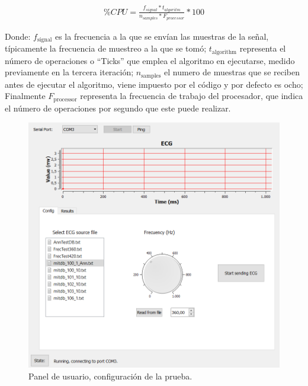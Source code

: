         \begin{align*}
            \%CPU = \frac{f_{signal}*t_{algoritm}}{n_{samples} * F_{processor}} * 100
        \end{align*}
        
         Donde: \( f_{\mathrm{signal}}\) es la frecuencia a la que se envían las muestras de la señal, típicamente la frecuencia de muestreo a la que se tomó; \( t_{\mathrm{algorithm}}\) representa el número de operaciones o ``Ticks'' que emplea el algoritmo en ejecutarse, medido previamente en la tercera iteración; \( n_{\mathrm{samples}}\) el numero de muestras que se reciben antes de ejecutar el algoritmo, viene impuesto por el código y por defecto es ocho; Finalmente  \( F_{\mathrm{processor}}\) representa la frecuencia de trabajo del procesador, que indica el número de operaciones por segundo que este puede realizar.
         
          \begin{figure}[H]
            \centering
                    \includegraphics[width = \linewidth]{figuras/Config.PNG}
            \caption{Panel de usuario, configuración de la prueba.}
            \label{fig:EndConfig}
        \end{figure}
        
